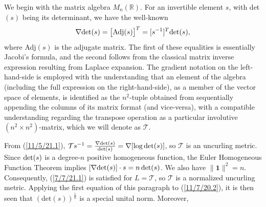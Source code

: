 \documentclass{amsart}
\numberwithin{equation}{section}
\theoremstyle{definition}
\numberwithin{theorem}{section}
\begin{document}
 We begin with the matrix algebra $ M_n(\mathbb{R})$. For an invertible element $s$, with det$(s)$ being its determinant, we have the well-known
  \begin{equation}\label{11/5/21.1} \nabla \mbox{det}(s) = \big[{\rm Adj}(s)\big]^T = [s^{-1}]^T\mbox{det}(s),\end{equation} where Adj$(s)$ is the adjugate matrix.  The first of these equalities is essentially Jacobi's formula, and the second follows from the classical matrix inverse expression resulting from Laplace expansion.  The gradient notation on the left-hand-side is employed with the understanding that an element of the algebra (including the full expression on the right-hand-side), as a member of the vector space of elements, is identified as the $n^2$-tuple obtained from sequentially appending the columns of its matrix format (and vice-versa), with a compatible understanding regarding the transpose operation as a particular involutive $(n^2\times n^2)$-matrix, which we will denote as $\mathcal{T}$. 
  
From (\ref{11/5/21.1}), $\mathcal{T}s^{-1} = \frac{\nabla{\rm det}(s)}{{\rm det}(s)} = \nabla[\log{\rm det}(s)]$, so $\mathcal{T}$ is an uncurling metric.  Since ${\rm det}(s)$ is a degree-$n$ positive homogeneous function, the Euler Homogeneous Function Theorem implies $[\nabla{\rm det}(s)]\cdot s = n \,{\rm det}(s)$.  We also have $\|\mathbf{1}\|^2 = n$.  Consequently, (\ref{7/7/21.1}) is satisfied for $L=\mathcal{T}$, so $\mathcal{T}$ is a normalized uncurling metric.  Applying the first equation of this paragraph to (\ref{11/7/20.2}), it is then seen that $(\text{det}(s))^{\frac{1}{n}}$ is a special unital norm.
  Moreover,
 
\end{document}
